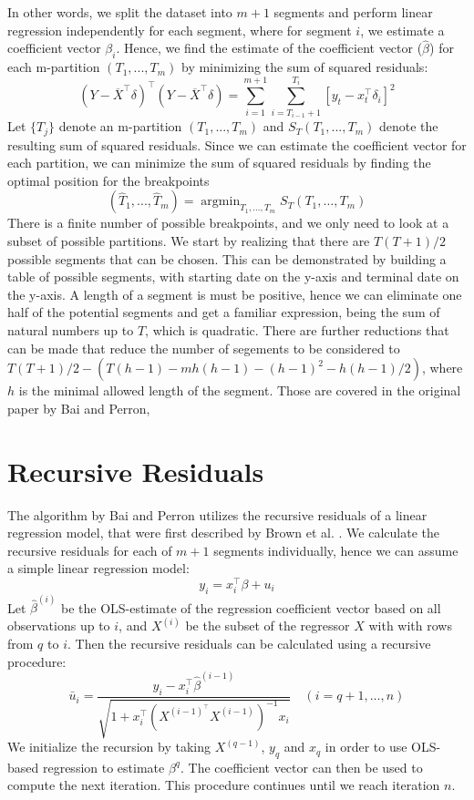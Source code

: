\documentclass[main.tex]{subfiles}
\begin{document}
In other words, we split the dataset into $m+1$ segments and perform linear
regression independently for each segment, where for segment $i$, we estimate
a coefficient vector $\beta_i$.
Hence, we find the estimate of the coefficient vector ($\hat{\beta}$) for each
m-partition $(T_1, ..., T_m)$ by minimizing the sum of squared residuals:
\[
(Y - \overline{X}^{\top}\delta)^{\top} (Y - \overline{X}^{\top}\delta) =
\sum_{i=1}^{m+1}\sum_{i=T_{i-1} + 1}^{T_i} \left[ y_t - x_t^{\top}\delta_i \right]^2
\]
Let $\{T_j\}$ denote an m-partition $(T_1, ..., T_m)$ and $S_T(T_1, ..., T_m)$
denote the resulting sum of squared residuals. Since we can estimate the
coefficient vector for each partition, we can minimize the sum of
squared residuals by finding the optimal position for the breakpoints
\[
(\hat{T}_1, ..., \hat{T}_m) = \operatorname{argmin}_{T_{1}, \ldots, T_{m}}
S_{T}\left(T_{1}, \ldots, T_{m}\right)
\]
There is a finite number of possible breakpoints, and we only need to look at
a subset of possible partitions. We start by realizing that there are $T(T+1)/2$
possible segments that can be chosen. This can be demonstrated by building a
table of possible segments, with starting date on the y-axis and terminal date
on the y-axis. A length of a segment is must be positive, hence we can eliminate
one half of the potential segments and get a familiar expression, being the sum
of natural numbers up to $T$, which is quadratic. There are further reductions
that can be made that reduce the number of segements to be considered to
$T(T+1)/2 - \left(T(h-1)-m h(h-1)-(h-1)^{2}-h(h-1) / 2\right)$, where $h$ is the minimal
allowed length of the segment. Those are covered
in the original paper by Bai and Perron, 

\section{Recursive Residuals}
\label{sec:recursive_residuals}
The algorithm by Bai and Perron utilizes the recursive residuals
of a linear regression model, that were first described by Brown et al.
\cite{brown75}. We calculate the recursive residuals for each of $m + 1$
segments individually, hence we can assume a simple linear regression model:
\[
y_i = x_i^{\top} \beta + u_i
\]
Let $\hat{\beta}^{(i)}$ be the OLS-estimate of the regression coefficient
vector based on all observations up to $i$, and $X^{(i)}$ be the subset of the
regressor $X$ with with rows from $q$ to $i$. Then the recursive residuals can
be calculated using a recursive procedure:
\[
\bar{u}_{i}=\frac{y_{i}-x_{i}^{\top}
  \hat{\beta}^{(i-1)}}{\sqrt{1+x_{i}^{\top}\left(X^{(i-1)^{\top}}
    X^{(i-1)}\right)^{-1} x_{i}}} \quad(i=q+1, \ldots, n)
\]
We initialize the recursion by taking $X^{(q-1)}$, $y_{q}$ and $x_{q}$ in order to
use OLS-based regression to estimate $\beta^{q}$. The coefficient vector can
then be used to compute the next iteration. This procedure continues until we
reach iteration $n$. 
\end{document}
